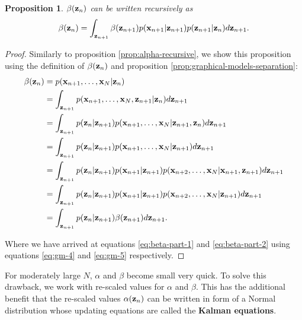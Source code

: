 \documentclass[11pt]{article}
\numberwithin{equation}{section}
\newcommand{\x}{{\bf x}}
\newcommand{\z}{{\bf z}}
\newtheorem{proposition}{Proposition}[section]
\begin{document}
\begin{proposition} \label{prop:beta-recursive}
	$\beta(\z_n)$ can be written recursively as
	\begin{equation}
		\beta(\z_n) = \int_{\z_{n+1}} \beta(\z_{n+1})p(\x_{n+1}\vert \z_{n+1}) p(\z_{n+1}\vert \z_n) d\z_{n+1}.
	\end{equation} 
\end{proposition}

\begin{proof}
	Similarly to proposition \ref{prop:alpha-recursive}, we show this proposition using the definition of $\beta(\z_n)$ and proposition \ref{prop:graphical-models-separation}:
	\begin{align}
		\beta(\z_n) &= p(\x_{n+1}, \ldots, \x_N \vert \z_n)\\
		&= \int_{\z_{n+1}} p(\x_{n+1}, \ldots, \x_N, \z_{n+1} \vert \z_n) d\z_{n+1} \\
		&= \int_{\z_{n+1}} p(\z_n \vert \z_{n+1}) p(\x_{n+1}, \ldots, \x_N \vert \z_{n+1}, \z_n) d\z_{n+1} \\
		&= \int_{\z_{n+1}} p(\z_n \vert \z_{n+1}) p(\x_{n+1}, \ldots, \x_N \vert \z_{n+1}) d\z_{n+1} \label{eq:beta-part-1} \\
		&= \int_{\z_{n+1}} p(\z_n \vert \z_{n+1}) p(\x_{n+1} \vert \z_{n+1}) p(\x_{n+2}, \ldots, \x_N \vert \x_{n+1}, \z_{n+1}) d\z_{n+1} \\
		&= \int_{\z_{n+1}} p(\z_n \vert \z_{n+1}) p(\x_{n+1} \vert \z_{n+1}) p(\x_{n+2}, \ldots, \x_N \vert \z_{n+1}) d\z_{n+1} \label{eq:beta-part-2}\\
		&= \int_{\z_{n+1}} p(\z_n \vert \z_{n+1}) \beta(\z_{n+1}) d\z_{n+1}.
	\end{align}
	
	Where we have arrived at equations \eqref{eq:beta-part-1} and \eqref{eq:beta-part-2} using equations \eqref{eq:gm-4} and \eqref{eq:gm-5} respectively.
\end{proof}

For moderately large $N$, $\alpha$ and $\beta$ become small very quick. To solve this drawback, we work with re-scaled values for $\alpha$ and $\beta$. This has the additional benefit that the re-scaled values $\alpha(\z_n)$ can be written in form of a Normal distribution whose updating equations are  called the \textbf{Kalman equations}.

\end{document}
